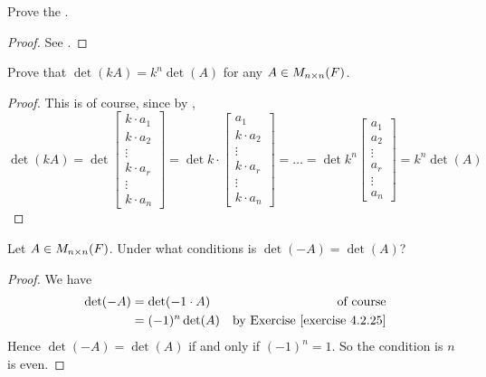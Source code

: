 \begin{exercise} \label{exercise 4.2.24}
Prove the .
\end{exercise}

\begin{proof}
See .
\end{proof}

\begin{exercise} \label{exercise 4.2.25}
Prove that \(\det(kA) = k^n \det(A)\) for any \(A \in M_{n \times n}(F)\).
\end{exercise}

\begin{proof}
This is of course, since by ,
\[
    \det(k A)=\det\left[\begin{array}{c} k \cdot a_1 \\ k \cdot a_2 \\ \vdots \\ k \cdot a_r \\ \vdots \\ k \cdot a_n \end{array}\right]
    = \det k \cdot\left[\begin{array}{c} a_1 \\ k \cdot a_2 \\ \vdots \\ k \cdot a_r \\ \vdots \\ k \cdot a_n \end{array}\right]
    = \ldots
    = \det k^{n}\left[\begin{array}{c} a_1 \\ a_2 \\ \vdots \\ a_r \\ \vdots \\ a_n \end{array}\right]
    = k^n \det(A)
\]
\end{proof}

\begin{exercise} \label{exercise 4.2.26}
Let \(A \in M_{n \times n}(F)\).
Under what conditions is \(\det(-A) = \det(A)\)?
\end{exercise}

\begin{proof}
We have
\begin{align*}
    \det(-A) & = \det(-1 \cdot A) & \text{of course} \\
             & = (-1)^n \det(A) & \text{by \EXEC{4.2.25}}
\end{align*}
Hence \(\det(-A) = \det(A)\) if and only if \((-1)^n = 1\).
So the condition is \(n\) is even.
\end{proof}

